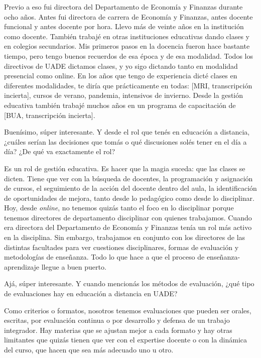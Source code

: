 \begin{description}[leftmargin=0cm, labelsep=0.5cm, style=nextline]
Previo a eso fui directora del Departamento de Economía y Finanzas durante ocho años. Antes fui directora de carrera de Economía y Finanzas, antes docente funcional y antes docente por hora. Llevo más de veinte años en la institución como docente.
También trabajé en otras instituciones educativas dando clases y en colegios secundarios. Mis primeros pasos en la docencia fueron hace bastante tiempo, pero tengo buenos recuerdos de esa época y de esa modalidad.
Todos los directivos de UADE dictamos clases, y yo sigo dictando tanto en modalidad presencial como online. En los años que tengo de experiencia dicté clases en diferentes modalidades, te diría que prácticamente en todas: [MRI, transcripción incierta], cursos de verano, pandemia, intensivos de invierno. Desde la gestión educativa también trabajé muchos años en un programa de capacitación de [BUA, transcripción incierta].
\item[\textbf{Entrevistadores:}] Buenísimo, súper interesante. Y desde el rol que tenés en educación a distancia, ¿cuáles serían las decisiones que tomás o qué discusiones solés tener en el día a día? ¿De qué va exactamente el rol?
\item[\textbf{Entrevistada:}] Es un rol de gestión educativa. Es hacer que la magia suceda: que las clases se dicten. Tiene que ver con la búsqueda de docentes, la programación y asignación de cursos, el seguimiento de la acción del docente dentro del aula, la identificación de oportunidades de mejora, tanto desde lo pedagógico como desde lo disciplinar.
Hoy, desde \textit{online}, no tenemos quizás tanto el foco en lo disciplinar porque tenemos directores de departamento disciplinar con quienes trabajamos. Cuando era directora del Departamento de Economía y Finanzas tenía un rol más activo en la disciplina. Sin embargo, trabajamos en conjunto con los directores de las distintas facultades para ver cuestiones disciplinares, formas de evaluación y metodologías de enseñanza. Todo lo que hace a que el proceso de enseñanza-aprendizaje llegue a buen puerto.
\item[\textbf{Entrevistadores:}] Ajá, súper interesante. Y cuando mencionás los métodos de evaluación, ¿qué tipo de evaluaciones hay en educación a distancia en UADE?
\item[\textbf{Entrevistada:}] Como criterios o formatos, nosotros tenemos evaluaciones que pueden ser orales, escritas, por evaluación continua o por desarrollo y defensa de un trabajo integrador. Hay materias que se ajustan mejor a cada formato y hay otras limitantes que quizás tienen que ver con el expertise docente o con la dinámica del curso, que hacen que sea más adecuado uno u otro.

\end{description}
